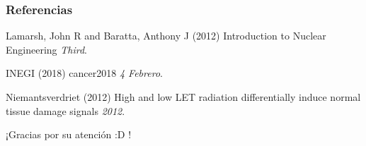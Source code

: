 \documentclass{beamer}
\begin{document}





\begin{frame}
\frametitle{Referencias}

\footnotesize{
\begin{thebibliography}{99} %
 Lamarsh, John R and Baratta, Anthony J (2012)
\newblock Introduction to Nuclear Engineering
\newblock \emph{Third}. 

 INEGI (2018)
\newblock cancer2018
\newblock \emph{4 Febrero}.

 Niemantsverdriet (2012)
\newblock High and low LET radiation differentially induce normal tissue damage signals
\newblock \emph{2012}.
\end{thebibliography}
}
\end{frame}


\begin{frame}
\Huge{\centerline{¡Gracias por su atención :D !}}
\end{frame}

\end{document}

